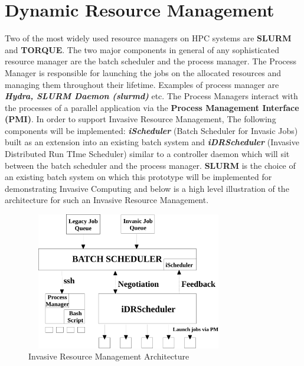 \section{Dynamic Resource Management}
Two of the most widely used resource managers on HPC systems are \textbf{SLURM} and \textbf{TORQUE}. The two major components in general of any sophisticated resource manager are the batch scheduler and the process manager. The Process Manager is responsible for launching the jobs on the allocated resources and managing them throughout their lifetime. Examples of process manager are \textbf{\textit{Hydra, SLURM Daemon (slurmd)}} etc. The Process Managers interact with the processes of a parallel application via the \textbf{Process Management Interface (PMI)}. In order to support Invasive Resource Management, The following components will be implemented: \textbf{\textit{iScheduler}} (Batch Scheduler for Invasic Jobs) built as an extension into an existing batch system and \textbf{\textit{iDRScheduler}} (Invasive Distributed Run TIme Scheduler) similar to a controller daemon which will sit between the batch scheduler and the process manager. \textbf{SLURM} is the choice of an existing batch system on which this prototype will be implemented for demonstrating Invasive Computing and below is a high level illustration of the architecture for such an Invasive Resource Management.\\ \par
\begin{figure}[!htbp]
\centering
\includegraphics[width=0.8\textwidth, height=60mm]{./figures/architecture.pdf}
\caption{Invasive Resource Management Architecture}
\label{fig:1}
\end{figure}
\noindent
